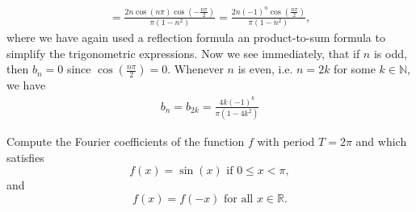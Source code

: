 \documentclass[11pt]{article}
\begin{document}
\begin{solution}
\begin{itemize}
\begin{align*}
        = \frac{2 n \cos(n \pi) \cos(- \frac{n \pi}{2})}{\pi ( 1 - n^2)} = \frac{2 n (-1)^n \cos(\frac{n \pi}{2})}{\pi ( 1 - n^2)},
    \end{align*}
    where we have again used a reflection formula an product-to-sum formula to simplify the trigonometric expressions. Now we see immediately, that if $n$ is odd, then $b_n = 0$ since $\cos(\frac{n \pi}{2}) = 0$.
    Whenever $n$ is even, i.e. $n= 2k$ for some $k \in \mathbb N$, we have
    \begin{align*}
        b_n = b_{2k} = \frac{4 k (-1)^k}{\pi (1 - 4 k^2)}
    \end{align*}
\end{itemize}
\end{solution}


\begin{exercise}
     Compute the Fourier coefficients of the function $f$ with period $T = 2\pi$ and which satisfies 
     \[
        f(x) = \sin(x) \text{ if } 0 \leq x  < \pi,
     \]
     and 
     \[
        f(x) = f(-x) \text{ for all } x \in \mathbb R.
     \]
\end{exercise}
\end{document}
